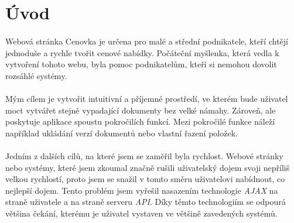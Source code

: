 \section{Úvod}
\paragraph{}
Webová stránka Cenovka je určena pro malé a střední podnikatele, kteří chtějí jednoduše a rychle tvořit cenové nabídky. Počáteční myšlenka, která vedla k vytvoření tohoto webu, byla pomoc podnikatelům, kteří si nemohou dovolit rozsáhlé systémy.  
\paragraph{}
Mým cílem je vytvořit intuitivní a příjemné prostředí, ve kterém bude uživatel moct vytvářet stejně vypadající dokumenty bez velké námahy. Zároveň, ale poskytuje aplikace spoustu pokročilích funkcí. Mezi pokročilé funkce náleží například ukládání verzí dokumentů nebo vlastní řazení položek.
\paragraph{}
Jedním z dalších cílů, na které jsem se zaměřil byla rychlost. Webové stránky nebo systémy, které jsem zkoumal značně rušili uživatelský dojem svoji nepříliš velkou rychlostí, proto jsem se snažil v tomto směru uživatelovi nabídnout, co nejlepší dojem. Tento problém jsem vyřešil nasazením technologie \textit{AJAX} na straně uživatele a na straně serveru \textit{API}. Díky těmto technologiím se odpourá většina čekání, kterému je uživatel vystaven ve většině zavedených systémů.  
\newpage
